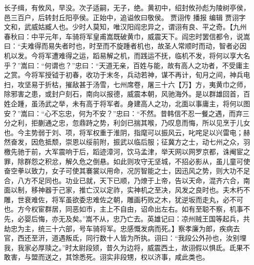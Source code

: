 \documentclass[12pt,UTF8]{ctexbook}
\begin{document}
长子缉，有攸风，早没。次子适嗣，无子，绝。黄初中，绍封攸孙彪为陵树亭侯，邑三百户，后转封丘阳亭侯。正始中，追谥攸曰敬侯。
贾诩传
播报
编辑
贾诩字文和，武威姑臧人也。少时人莫知，唯汉阳阎忠异之，谓诩有良、平之奇。【九州春秋曰：中平元年，车骑将军皇甫嵩既破黄巾，威震天下。阎忠时罢信都令，说嵩曰：“夫难得而易失者时也，时至而不旋踵者机也，故圣人常顺时而动，智者必因机以发。今将军遭难得之运，蹈易解之机，而践运不抚，临机不发，将何以享大名乎？”嵩曰：“何谓也？”忠曰：“天道无亲，百姓与能，故有高人之功者，不受庸主之赏。今将军授钺于初春，收功于末冬，兵动若神，谋不再计，旬月之间，神兵电扫，攻坚易于折枯，摧敌甚于汤雪，七州席卷，屠三十六【万】方，夷黄巾之师，除邪害之患，或封户刻石，南向以报德，威震本朝，风驰海外。是以群雄回首，百姓企踵，虽汤武之举，未有高于将军者。身建高人之功，北面以事庸主，将何以图安？”嵩曰：“心不忘忠，何为不安？”忠曰：“不然。昔韩信不忍一餐之遇，而弃三分之利，拒蒯通之忠，忽鼎跱之势，利剑已揣其喉，乃叹息而悔，所以见烹于儿女也。今主势弱于刘、项，将军权重于淮阴，指麾可以振风云，叱咤足以兴雷电；赫然奋发，因危抵颓，崇恩以绥前附，振武以临后服；征冀方之士，动七州之众，羽檄先驰于前，大军震响于后，蹈迹漳河，饮马孟津，举天网以网罗京都，诛阉宦之罪，除群怨之积忿，解久危之倒悬。如此则攻守无坚城，不招必影从，虽儿童可使奋空拳以致力，女子可使其褰裳以用命，况厉智能之士，因迅风之势，则大功不足合，八方不足同也。功业已就，天下已顺，乃燎于上帝，告以天命，混齐六合，南面以制，移神器于己家，推亡汉以定祚，实神机之至决，风发之良时也。夫木朽不雕，世衰难佐，将军虽欲委忠难佐之朝，雕画朽败之木，犹逆坂而走丸，必不可也。方今权宦群居，同恶如市，主上不自由，诏命出左右。如有至聪不察，机事不先，必婴后悔，亦无及矣。”嵩不从，忠乃亡去。英雄记曰：凉州贼王国等起兵，共劫忠为主，统三十六部，号车骑将军。忠感慨发病而死。】察孝廉为郎，疾病去官，西还至汧，道遇叛氐，同行数十人皆为所执。诩曰：“我段公外孙也，汝别埋我，我家必厚赎之。”时太尉段颎，昔久为边将，威震西土，故诩假以惧氐。氐果不敢害，与盟而送之，其馀悉死。诩实非段甥，权以济事，咸此类也。
\end{document}
